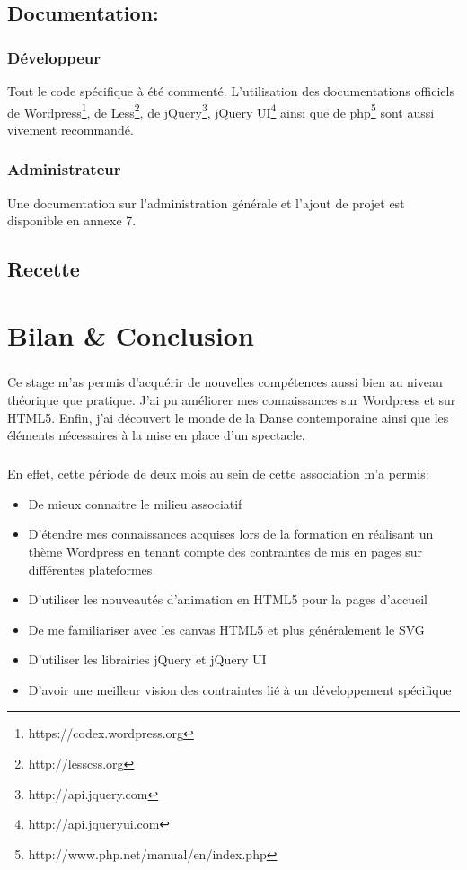 \documentclass[11pt,a4paper]{report}
\begin{document}
	\section{Documentation:}
		\subsection{Développeur}Tout le code spécifique à été commenté. L'utilisation des documentations officiels de Wordpress\footnote{https://codex.wordpress.org}, de Less\footnote{http://lesscss.org}, de jQuery\footnote{http://api.jquery.com}, jQuery UI\footnote{http://api.jqueryui.com} ainsi que de php\footnote{http://www.php.net/manual/en/index.php} sont aussi vivement recommandé.
		\subsection{Administrateur}Une documentation sur l'administration générale et l'ajout de projet est disponible en annexe 7.
	\section{Recette}

\chapter{Bilan \& Conclusion}
	\paragraph*{}Ce stage m'as permis d'acquérir de nouvelles compétences aussi bien au niveau théorique que pratique. J'ai pu améliorer mes connaissances sur Wordpress et sur HTML5. Enfin, j'ai découvert le monde de la Danse contemporaine ainsi que les éléments nécessaires à la mise en place d'un spectacle.
	\paragraph*{}En effet, cette période de deux mois au sein de cette association m'a permis:
	\begin{itemize}
		\item De mieux connaitre le milieu associatif
		\item D'étendre mes connaissances acquises lors de la formation en réalisant un thème Wordpress en tenant compte des contraintes de mis en pages sur différentes plateformes
		\item D'utiliser les nouveautés d'animation en HTML5 pour la pages d'accueil
		\item De me familiariser avec les canvas HTML5 et plus généralement le SVG
		\item D'utiliser les librairies jQuery et jQuery UI
		\item D'avoir une meilleur vision des contraintes lié à un développement spécifique
	\end{itemize}
\end{document}
